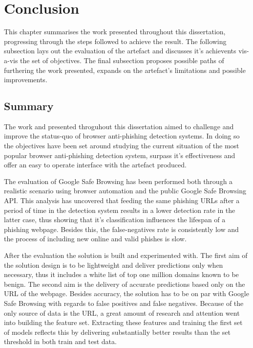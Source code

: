 \chapter{Conclusion}
This chapter summarises the work presented throughout this dissertation, progressing through the steps followed to achieve the result. The following subsection lays out the evaluation of the artefact and discusses it's achievents vis-a-vis the set of objectives. The final subsection proposes possible paths of furthering the work presented, expands on the artefact's limitations and possible improvements.

\section{Summary}
The work and presented throguhout this dissertation aimed to challenge and improve the status-quo of browser anti-phishing detection systems. In doing so the objectives have been set around studying the current situation of the most popular browser anti-phishing detection system, surpass it's effectiveness and offer an easy to operate interface with the artefact produced.

The evaluation of Google Safe Browsing has been performed both through a realistic scenario using browser automation and the public Google Safe Browsing API. This analysis has uncovered that feeding the same phishing URLs after a period of time in the detection system results in a lower detection rate in the latter case, thus showing that it's classification influences the lifespan of a phishing webpage. Besides this, the false-negatives rate is consistently low and the process of including new online and valid phishes is slow.

After the evaluation the solution is built and experimented with. The first aim of the solution design is to be lightweight and deliver predictions only when necessary, thus it includes a white list of top one million domains known to be benign. The second aim is the delivery of accurate predictions based only on the URL of the webpage. Besides accuracy, the solution has to be on par with Google Safe Browsing with regards to false positives and false negatives.
Because of the only source of data is the URL, a great amount of research and attention went into building the feature set. Extracting these features and training the first set of models reflects this by delivering substantially better results than the set threshold in both train and test data.

